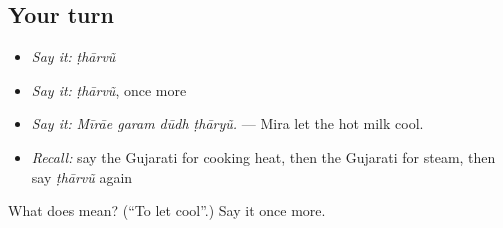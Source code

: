 \subsection*{Your turn}
\begin{itemize}
\raggedright
  \item \emph{Say it:} \emph{ṭhārvũ}
  \item \emph{Say it:} \emph{ṭhārvũ}, once more
  \item \emph{Say it:} \emph{Mīrāe garam dūdh ṭhāryũ.} — Mira let the hot milk cool.
  \item \emph{Recall:} say the Gujarati for cooking heat, then the Gujarati for steam, then say \emph{ṭhārvũ} again
\end{itemize}

\begin{tcolorbox}[breakable,colback=teal!4,colframe=teal!35!black,title={Before you move on}]
What does  mean? (\textquotedblleft{}To let cool\textquotedblright{}.) Say it once more.
\end{tcolorbox}
